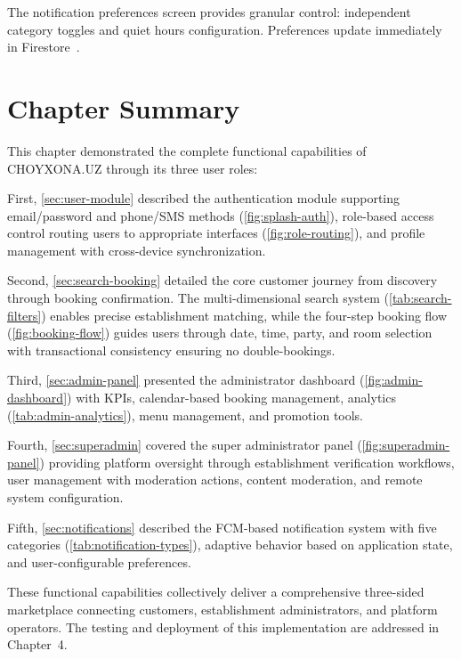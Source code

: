 The notification preferences screen provides granular control: independent category toggles and quiet hours configuration.
Preferences update immediately in Firestore~\cite{firebase_firestore2024}.


\section{Chapter Summary}
\label{sec:ch3-summary}

This chapter demonstrated the complete functional capabilities of CHOYXONA.UZ through its three user roles:

First, \cref{sec:user-module} described the authentication module supporting email/password and phone/SMS methods (\cref{fig:splash-auth}), role-based access control routing users to appropriate interfaces (\cref{fig:role-routing}), and profile management with cross-device synchronization.

Second, \cref{sec:search-booking} detailed the core customer journey from discovery through booking confirmation.
The multi-dimensional search system (\cref{tab:search-filters}) enables precise establishment matching, while the four-step booking flow (\cref{fig:booking-flow}) guides users through date, time, party, and room selection with transactional consistency ensuring no double-bookings.

Third, \cref{sec:admin-panel} presented the administrator dashboard (\cref{fig:admin-dashboard}) with KPIs, calendar-based booking management, analytics (\cref{tab:admin-analytics}), menu management, and promotion tools.

Fourth, \cref{sec:superadmin} covered the super administrator panel (\cref{fig:superadmin-panel}) providing platform oversight through establishment verification workflows, user management with moderation actions, content moderation, and remote system configuration.

Fifth, \cref{sec:notifications} described the FCM-based notification system with five categories (\cref{tab:notification-types}), adaptive behavior based on application state, and user-configurable preferences.

These functional capabilities collectively deliver a comprehensive three-sided marketplace connecting customers, establishment administrators, and platform operators.
The testing and deployment of this implementation are addressed in Chapter~4.
